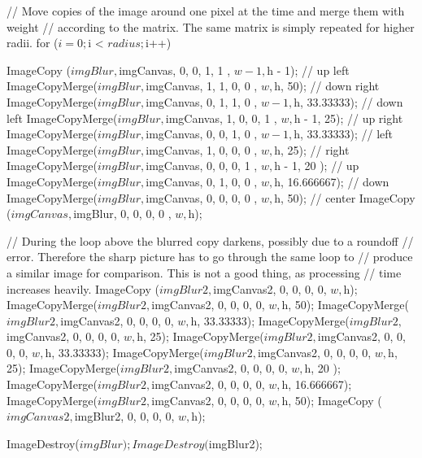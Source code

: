\begin{DoxyCode}
{{                        // Move copies of the image around one pixel at the
       time and merge them with weight
                        // according to the matrix. The same matrix is simply
       repeated for higher radii.
                        for ($i = 0; $i < $radius; $i++)        {
                                ImageCopy     ($imgBlur, $imgCanvas, 0, 0, 1, 1
      , $w - 1, $h - 1);            // up left
                                ImageCopyMerge($imgBlur, $imgCanvas, 1, 1, 0, 0
      , $w,     $h,     50);        // down right
                                ImageCopyMerge($imgBlur, $imgCanvas, 0, 1, 1, 0
      , $w - 1, $h,     33.33333);  // down left
                                ImageCopyMerge($imgBlur, $imgCanvas, 1, 0, 0, 1
      , $w,     $h - 1, 25);        // up right
                                ImageCopyMerge($imgBlur, $imgCanvas, 0, 0, 1, 0
      , $w - 1, $h,     33.33333);  // left
                                ImageCopyMerge($imgBlur, $imgCanvas, 1, 0, 0, 0
      , $w,     $h,     25);        // right
                                ImageCopyMerge($imgBlur, $imgCanvas, 0, 0, 0, 1
      , $w,     $h - 1, 20 );       // up
                                ImageCopyMerge($imgBlur, $imgCanvas, 0, 1, 0, 0
      , $w,     $h,     16.666667); // down
                                ImageCopyMerge($imgBlur, $imgCanvas, 0, 0, 0, 0
      , $w,     $h,     50);        // center
                                ImageCopy     ($imgCanvas, $imgBlur, 0, 0, 0, 0
      , $w,     $h);

                                // During the loop above the blurred copy
       darkens, possibly due to a roundoff
                                // error. Therefore the sharp picture has to go
       through the same loop to
                                // produce a similar image for comparison. This
       is not a good thing, as processing
                                // time increases heavily.
                                ImageCopy     ($imgBlur2, $imgCanvas2, 0, 0, 0,
       0, $w, $h);
                                ImageCopyMerge($imgBlur2, $imgCanvas2, 0, 0, 0,
       0, $w, $h, 50);
                                ImageCopyMerge($imgBlur2, $imgCanvas2, 0, 0, 0,
       0, $w, $h, 33.33333);
                                ImageCopyMerge($imgBlur2, $imgCanvas2, 0, 0, 0,
       0, $w, $h, 25);
                                ImageCopyMerge($imgBlur2, $imgCanvas2, 0, 0, 0,
       0, $w, $h, 33.33333);
                                ImageCopyMerge($imgBlur2, $imgCanvas2, 0, 0, 0,
       0, $w, $h, 25);
                                ImageCopyMerge($imgBlur2, $imgCanvas2, 0, 0, 0,
       0, $w, $h, 20 );
                                ImageCopyMerge($imgBlur2, $imgCanvas2, 0, 0, 0,
       0, $w, $h, 16.666667);
                                ImageCopyMerge($imgBlur2, $imgCanvas2, 0, 0, 0,
       0, $w, $h, 50);
                                ImageCopy     ($imgCanvas2, $imgBlur2, 0, 0, 0,
       0, $w, $h);
                        }
                        ImageDestroy($imgBlur);
                        ImageDestroy($imgBlur2);
                }

}
\end{DoxyCode}
